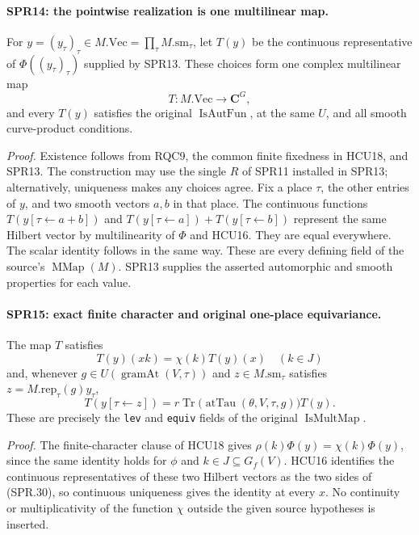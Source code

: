\documentclass[11pt,a4paper]{article}
\numberwithin{equation}{section}
\theoremstyle{remark}\newtheorem{remark}[theorem]{Remark}
\begin{document}
\paragraph{SPR14: the pointwise realization is one multilinear map.}
\label{claim:SPR14}
For \(y=(y_\tau)_\tau\in M.\mathrm{Vec}=\prod_\tau M.\mathrm{sm}_\tau\),
let \(T(y)\) be the continuous representative of
\(\Phi((y_\tau)_\tau)\) supplied by SPR13.
These choices form one complex multilinear map
\[
                    T:M.\mathrm{Vec}\longrightarrow\mathbf C^G,
 \tag{SPR.29}
\]
and every \(T(y)\) satisfies the original
\(\operatorname{IsAutFun}\), at the same \(U\), and all smooth
curve-product conditions.

\emph{Proof.}
Existence follows from RQC9, the common finite fixedness in
HCU18, and SPR13.  The construction may use the single \(R\)
of SPR11 installed in SPR13; alternatively, uniqueness makes
any choices agree.
Fix a place \(\tau\), the other entries of \(y\), and two smooth
vectors \(a,b\) in that place.
The continuous functions
\(T(y[\tau\leftarrow a+b])\) and
\(T(y[\tau\leftarrow a])+T(y[\tau\leftarrow b])\)
represent the same Hilbert vector by multilinearity of \(\Phi\)
and HCU16.  They are equal everywhere.
The scalar identity follows in the same way.
These are every defining field of the source's
\(\operatorname{MMap}(M)\).  SPR13 supplies the asserted
automorphic and smooth properties for each value.

\paragraph{SPR15: exact finite character and original one-place equivariance.}
\label{claim:SPR15}
The map \(T\) satisfies
\[
 T(y)(xk)=\chi(k)T(y)(x)\quad(k\in J)
 \tag{SPR.30}
\]
and, whenever \(g\in U(\operatorname{gramAt}(V,\tau))\) and
\(z\in M.\mathrm{sm}_\tau\) satisfies
\(z=M.\mathrm{rep}_\tau(g)y_\tau\),
\[
             T(y[\tau\leftarrow z])
              =r\operatorname{Tr}\bigl(\operatorname{atTau}
                    (\theta,V,\tau,g)\bigr)T(y).
 \tag{SPR.31}
\]
These are precisely the \texttt{lev} and \texttt{equiv} fields
of the original \(\operatorname{IsMultMap}\).

\emph{Proof.}
The finite-character clause of HCU18 gives
\(\rho(k)\Phi(y)=\chi(k)\Phi(y)\), since the same identity holds
for \(\phi\) and \(k\in J\subseteq G_f(V)\).
HCU16 identifies the continuous representatives of these two
Hilbert vectors as the two sides of (SPR.30), so continuous
uniqueness gives the identity at every \(x\).
No continuity or multiplicativity of the function \(\chi\)
outside the given source hypotheses is inserted.
\end{document}
